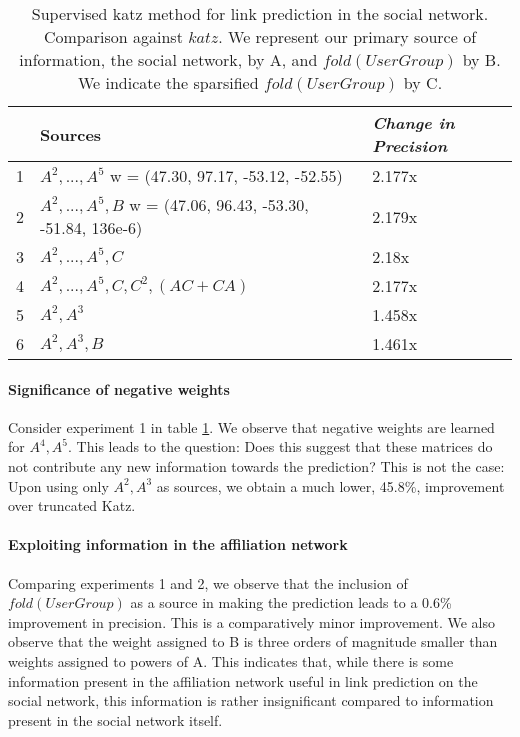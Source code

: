 \documentclass{report}
\begin{document}
\begin{table}
\centering
\begin{tabular}{|l|p{5cm} |  p{2cm}|}
\hline
 & Sources & \textit{Change in Precision}\\[1ex]
\hline
1 & $A^{2}, ..., A^{5}$ \newline
w = (47.30, 97.17, -53.12, -52.55)& 2.177x\\
\hline
2 & $A^{2}, ..., A^{5}, B$ \newline
w = (47.06, 96.43, -53.30, -51.84, 136e-6)& 2.179x\\
\hline
3 & $A^{2}, ..., A^{5}, C$ & 2.18x\\
\hline
4 & $A^{2}, ..., A^{5}, C, C^{2}, (AC + CA)$ & 2.177x\\
\hline
5 & $A^{2}, A^{3}$ & 1.458x\\
\hline
6 & $A^{2}, A^{3}, B$ & 1.461x\\
\hline
\end{tabular}
\caption{Supervised katz method for link prediction in the social network. Comparison against $katz$. We represent our primary source of information, the social network, by A, and $fold(UserGroup)$ by B. We indicate the sparsified $fold(UserGroup)$ by C.}
\label{tab:supervisedSoc}
\end{table} 

\paragraph*{Significance of negative weights}
Consider experiment 1 in table \ref{tab:supervisedSoc}. We observe that negative weights are learned for $A^{4}, A^{5}$. This leads to the question: Does this suggest that these matrices do not contribute any new information towards the prediction? This is not the case: Upon using only $A^{2}, A^{3}$ as sources, we obtain a much lower, 45.8\%, improvement over truncated Katz.

\paragraph*{Exploiting information in the affiliation network}
Comparing experiments 1 and 2, we observe that the inclusion of $fold(UserGroup)$ as a source in making the prediction leads to a 0.6\% improvement in precision. This is a comparatively minor improvement. We also observe that the weight assigned to B is three orders of magnitude smaller than weights assigned to powers of A. This indicates that, while there is some information present in the affiliation network useful in link prediction on the social network, this information is rather insignificant compared to information present in the social network itself.
\end{document}
